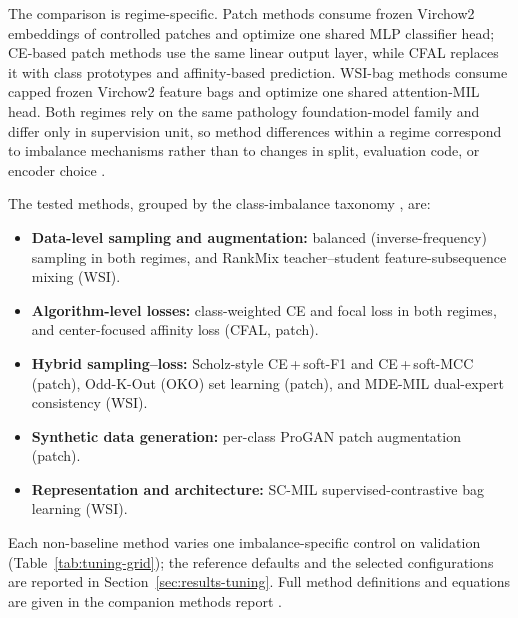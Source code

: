 \documentclass[11pt]{article}
\begin{document}
The comparison is regime-specific. Patch methods consume frozen Virchow2 embeddings of controlled patches and optimize one shared MLP classifier head; CE-based patch methods use the same linear output layer, while CFAL replaces it with class prototypes and affinity-based prediction. WSI-bag methods consume capped frozen Virchow2 feature bags and optimize one shared attention-MIL head. Both regimes rely on the same pathology foundation-model family and differ only in supervision unit, so method differences within a regime correspond to imbalance mechanisms rather than to changes in split, evaluation code, or encoder choice \citep{queisler2026imbalanceMethods}.

The tested methods, grouped by the class-imbalance taxonomy \citep{saini2023tacklingClass,zhang2023deepLong}, are:
\begin{itemize}
  \item \textbf{Data-level sampling and augmentation:} balanced (inverse-frequency) sampling in both regimes, and RankMix teacher--student feature-subsequence mixing (WSI).
  \item \textbf{Algorithm-level losses:} class-weighted CE and focal loss in both regimes, and center-focused affinity loss (CFAL, patch).
  \item \textbf{Hybrid sampling--loss:} Scholz-style CE\,+\,soft-F1 and CE\,+\,soft-MCC (patch), Odd-K-Out (OKO) set learning (patch), and MDE-MIL dual-expert consistency (WSI).
  \item \textbf{Synthetic data generation:} per-class ProGAN patch augmentation (patch).
  \item \textbf{Representation and architecture:} SC-MIL supervised-contrastive bag learning (WSI).
\end{itemize}
\noindent Each non-baseline method varies one imbalance-specific control on validation (Table~\ref{tab:tuning-grid}); the reference defaults and the selected configurations are reported in Section~\ref{sec:results-tuning}. Full method definitions and equations are given in the companion methods report \citep{queisler2026imbalanceMethods}.
\end{document}
